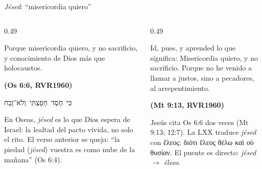\documentclass[hyperref={bookmarks=false},aspectratio=169]{beamer}
\newcommand{\heb}[1]{\mbox{\foreignlanguage{hebrew}{#1}}}
\newcommand{\grc}[1]{\foreignlanguage{ancientgreek}{#1}}
\newcommand{\fuente}[1]{\par\hfill{\upshape\bfseries\footnotesize\textcolor{azul}{#1}}}
\begin{document}
\begin{frame}{\emph{Jésed}: ``misericordia quiero''}
\begin{columns}[t,onlytextwidth]
\begin{column}{0.49\textwidth}
\begin{cita}Porque misericordia quiero, y no sacrificio, y conocimiento de Dios más que holocaustos.\fuente{(Os 6:6, RVR1960)}\end{cita}
\begin{center}\heb{כִּי חֶסֶד חָפַצְתִּי וְלֹא־זָבַח}\end{center}
\scriptsize En Oseas, \emph{jésed} es lo que Dios espera de Israel: la lealtad del pacto vivida, no solo el rito. El verso anterior se queja: ``la piedad (\emph{jésed}) vuestra es como nube de la mañana'' (Os 6:4).
\end{column}
\begin{column}{0.49\textwidth}
\begin{cita}Id, pues, y aprended lo que significa: Misericordia quiero, y no sacrificio. Porque no he venido a llamar a justos, sino a pecadores, al arrepentimiento.\fuente{(Mt 9:13, RVR1960)}\end{cita}
\scriptsize Jesús cita Os 6:6 dos veces (Mt 9:13; 12:7). La LXX traduce \emph{jésed} con \grc{ἔλεος}: \grc{διότι ἔλεος θέλω καὶ οὐ θυσίαν}. El puente es directo: \emph{jésed} $\rightarrow$ \emph{éleos}.
\end{column}
\end{columns}
\end{frame}
\end{document}
